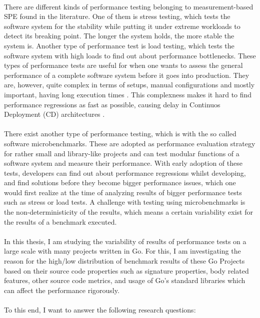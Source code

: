 \documentclass{seal_thesis}
\begin{document}
\\
There are different kinds of performance testing belonging to measurement-based SPE found in the literature. One of them is stress testing, which tests the software system for the stability while putting it under extreme workloads to detect its breaking point. The longer the system holds, the more stable the system is. Another type of performance test is load testing, which tests the software system with high loads to find out about performance bottlenecks. These types of performance tests are useful for when one wants to assess the general performance of a complete software system before it goes into production. They are, however, quite complex in terms of setups, manual configurations and mostly important, having long execution times \cite{Nguyen:2014:ICS:2597073.2597092}. This complexness makes it hard to find performance regressions as fast as possible, causing delay in Continuos Deployment (CD) architectures \cite{Laaber:2018:EOS:3196398.3196407}.\\
\\
There exist another type of performance testing, which is with the so called software microbenchmarks. These are adopted as performance evaluation strategy for rather small and library-like projects\cite{laaber2019software} and can test modular functions of a software system and measure their performance. With early adoption of these tests, developers can find out about performance regressions whilst developing, and find solutions before they become bigger performance issues, which one would first realize at the time of analyzing results of bigger performance tests such as stress or load tests. A challenge with testing using microbenchmarks is the non-deterministicity of the results, which means a certain variability exist for the results of a benchmark executed\cite{Laaber:2018:EOS:3196398.3196407}.\\
\\
In this thesis, I am studying the variability of results of performance tests on a large scale with many projects written in Go. For this, I am investigating the reason for the high/low distribution of benchmark results of these Go Projects based on their source code properties such as signature properties, body related features, other source code metrics, and usage of Go's standard libraries which can affect the performance rigorously.\\
\\
To this end, I want to answer the following research questions: \\
\end{document}
